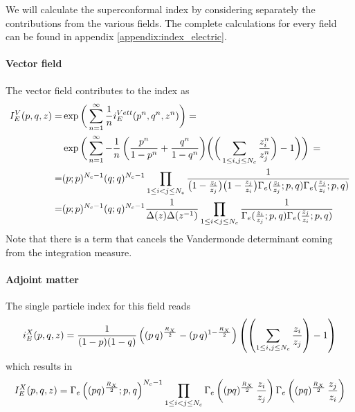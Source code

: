 We will calculate the superconformal index by considering separately the contributions from the various fields.
The complete calculations for every field can be found in appendix \ref{appendix:index_electric}.\\
\paragraph{Vector field}
The vector field contributes to the index as
\begin{equation}
\begin{aligned} 
I_E^V(p,q,z) = &\exp \bigg( \sum_{n=1}^{\infty} {1 \over n} i_E^{Vett} (p^n,q^n,z^n) \bigg) = \\
 &\exp \bigg( \sum_{n=1}^{\infty} - {1 \over n} \, \bigg( {p^n \over 1-p^n} + {q^n \over 1-q^n} \bigg)  \bigg(\bigg( \sum_{ 1 \leq i,j \leq N_c}  {z_i^n \over z_j^n}  \bigg)- 1 \bigg) \bigg) \, = \\
 = & (p;p)^{N_c-1} ( q;q)^{N_c-1}  \prod_{ 1 \leq i < j \leq N_c} \frac{ 1 }{ \big( 1 -{ z_i \over z_j} \big) \big ( 1 - { z_j \over z_i} \big) \Gamma_e( {z_i \over z_j};p,q) \Gamma_e({z_j \over z_i}; p,q)  } \\
 =& (p;p)^{N_c-1} ( q;q)^{N_c-1} \frac{1}{ \Delta(z) \Delta (z^{-1})}   \prod_{ 1 \leq i < j \leq N_c}   \frac{ 1 }{ \Gamma_e( {z_i \over z_j};p,q) \Gamma_e({z_j \over z_i}; p,q)}
 \end{aligned}
 \label{eqn:sci_electric_vector}
 \end{equation}
 Note that there is a term that cancels the Vandermonde determinant coming from the integration measure. 
\paragraph{Adjoint matter}
The single particle index for this field reads
\begin{equation}
	i_E^{X}(p,q,z) = {1 \over (1-p)(1-q)}
	\left((p\,q)^{\frac{R_X}{2}}- (p\,q)^{1-\frac{R_X}{2}}\right) \left( \left(  \sum_{ 1 \leq i,j \leq N_c}  {z_i\over z_j}  \right)- 1 \right)
\end{equation}
which results in
\begin{equation}
 I_E^X (p,q,z) = \Gamma_e \left ( (pq)^\frac{R_X}{2};p,q \right)^{N_c-1} \displaystyle \prod_{1\leq i<j\leq N_c} \Gamma_e \left( (pq)^\frac{R_X}{2} \,  {z_i \over z_j} \right) \Gamma_e \left( (pq)^\frac{R_X}{2} \,  {z_j \over z_i}\right)
\end{equation}

